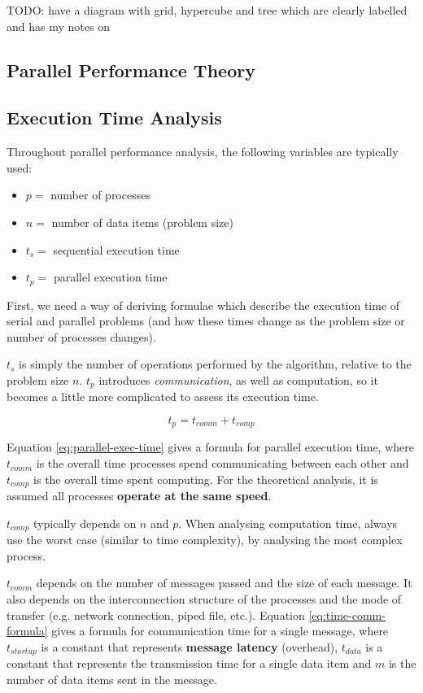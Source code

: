 \documentclass{article}
\begin{document}
TODO: have a diagram with grid, hypercube and tree which are clearly labelled and has my notes on
	
\subsection{Parallel Performance Theory}

\subsection{Execution Time Analysis}
\label{sec:exec-time-analysis}

Throughout parallel performance analysis, the following variables are typically used:
\begin{itemize}
	\item $p= $ number of processes
	\item $n= $ number of data items (problem size)
	\item $t_s= $ sequential execution time
	\item $t_p= $ parallel execution time
\end{itemize}

First, we need a way of deriving formulae which describe the execution time of serial and parallel problems (and how these times change as the problem size or number of processes changes).

$t_s$ is simply the number of operations performed by the algorithm, relative to the problem size $n$. $t_p$ introduces \textit{communication}, as well as computation, so it becomes a little more complicated to assess its execution time.

\begin{equation}
	t_p = t_{comm} + t_{comp}
	\label{eq:parallel-exec-time}
\end{equation}

Equation \ref{eq:parallel-exec-time} gives a formula for parallel execution time, where $t_{comm}$ is the overall time processes spend communicating between each other and $t_{comp}$ is the overall time spent computing. For the theoretical analysis, it is assumed all processes \textbf{operate at the same speed}.

$t_{comp}$ typically depends on $n$ and $p$. When analysing computation time, always use the worst case (similar to time complexity), by analysing the most complex process. 

$t_{comm}$ depends on the number of messages passed and the size of each message. It also depends on the interconnection structure of the processes and the mode of transfer (e.g. network connection, piped file, etc.). Equation \ref{eq:time-comm-formula} gives a formula for communication time for a single message, where $t_{startup}$ is a constant that represents \textbf{message latency} (overhead), $t_{data}$ is a constant that represents the transmission time for a single data item and $m$ is the number of data items sent in the message.
\end{document}
